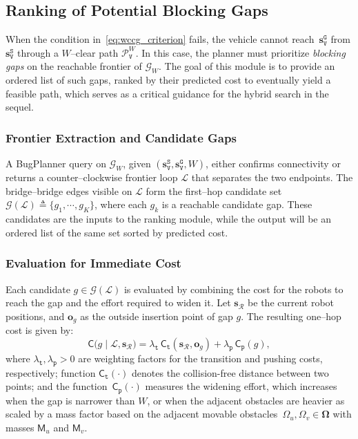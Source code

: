 \subsection{Ranking of Potential Blocking Gaps}\label{subsec:gap}

When the condition in~\eqref{eq:wccg_criterion} fails, the vehicle cannot
reach~$\mathbf{s}_\texttt{V}^{\texttt{G}}$ from
$\mathbf{s}_\texttt{V}^{\texttt{S}}$ through a $W$--clear path
$\mathcal{P}^W_\texttt{V}$. In this case, the planner must prioritize
\emph{blocking gaps} on the reachable frontier of $\mathcal{G}_W$. The goal of
this module is to provide an ordered list of such gaps, ranked by their
predicted cost to eventually yield a feasible path, which serves
as a critical guidance for the hybrid search in the sequel.

\subsubsection{Frontier Extraction and Candidate Gaps}
A BugPlanner query on $\mathcal{G}_W$, given
$(\mathbf{s}_\texttt{V}^{\texttt{S}},\mathbf{s}_\texttt{V}^{\texttt{G}},W)$,
either confirms connectivity or returns a counter--clockwise frontier loop
$\mathcal{L}$ that separates the two endpoints. The bridge--bridge edges
visible on $\mathcal{L}$ form the first--hop candidate set
$\mathcal{G}(\mathcal{L})\triangleq\{g_1,\cdots,g_K\}$,
where each $g_k$ is a reachable candidate gap. These candidates are the inputs
to the ranking module, while the output will be an ordered list of the same
set sorted by predicted cost.

\subsubsection{Evaluation for Immediate Cost}
Each candidate $g\in\mathcal{G}(\mathcal{L})$ is evaluated by combining the
cost for the robots to reach the gap and the effort required to widen it.
Let $\mathbf{s}_{\mathcal{R}}$ be the current robot positions,
and $\mathbf{o}_g$ as the outside insertion point of gap $g$. The
resulting one--hop cost is given by:
\begin{equation}\label{eq:step_cost}
\mathsf{C}\big(g \mid \mathcal{L}, \mathbf{s}_{\mathcal{R}}\big)
=\lambda_\texttt{t}\,\mathsf{C}_\texttt{t}\!\left(\mathbf{s}_{\mathcal{R}},\mathbf{o}_g\right)
+\lambda_\texttt{p}\,\mathsf{C}_\texttt{p}(g),
\end{equation}
where $\lambda_\texttt{t},\lambda_\texttt{p}>0$ are weighting factors
for the transition and pushing costs, respectively;
function $\mathsf{C}_\texttt{t}(\cdot)$ denotes the collision-free
distance between two points;
and the function~$\mathsf{C}_\texttt{p}(\cdot)$ measures the widening effort,
which increases when the gap is narrower than $W$,
or when the adjacent obstacles are heavier as scaled by a mass factor
based on the adjacent movable
obstacles~$\Omega_u,\Omega_v\in \boldsymbol{\Omega}$ with masses $\mathsf{M}_u$ and $\mathsf{M}_v$.

